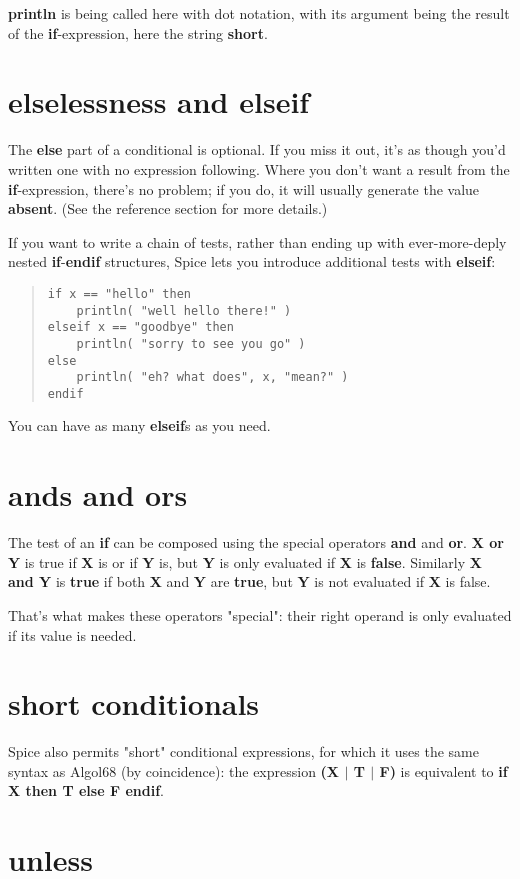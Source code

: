 \documentclass{report}
\begin{document}
{\bf println} is being called here with dot notation, with its argument being the
result of the {\bf if}-expression, here the string {\bf short}.

\section{elselessness and elseif}


The {\bf else} part of a conditional is optional. If you miss it out, it's as
though you'd written one with no expression following. Where you don't want a
result from the {\bf if}-expression, there's no problem; if you do, it will
usually generate the value {\bf absent}. (See the reference section for more
details.)

If you want to write a chain of tests, rather than ending up with
ever-more-deply nested {\bf if}-{\bf endif} structures, Spice lets you introduce
additional tests with {\bf elseif}:

\begin{quote}
\begin{verbatim}
if x == "hello" then
    println( "well hello there!" )
elseif x == "goodbye" then
    println( "sorry to see you go" )
else
    println( "eh? what does", x, "mean?" )
endif
\end{verbatim}
\end{quote}
You can have as many {\bf elseif}s as you need.\section{ands and ors}


The test of an {\bf if} can be composed using the special operators {\bf and} and
{\bf or}. {\bf X or Y} is true if {\bf X} is or if {\bf Y} is, but {\bf Y} is only evaluated if
{\bf X} is {\bf false}. Similarly {\bf X and Y} is {\bf true} if both {\bf X} and {\bf Y} are {\bf true},
but {\bf Y} is not evaluated if {\bf X} is false.

That's what makes these operators "special": their right operand is only
evaluated if its value is needed.\section{short conditionals}


Spice also permits "short" conditional expressions, for which it uses the same
syntax as Algol68 (by coincidence): the expression {\bf (X $\mid$ T $\mid$ F)} is
equivalent to {\bf if X then T else F endif}.\section{unless}
\end{document}
